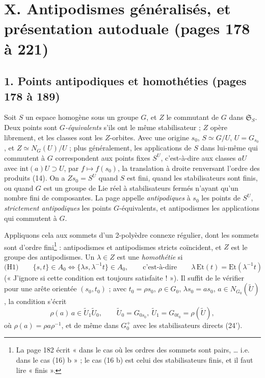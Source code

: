 \documentclass[11pt,a4paper]{article}
\begin{document}
\section*{X. Antipodismes généralisés, et présentation autoduale (pages 178 à 221)}

\subsection*{1. Points antipodiques et homothéties (pages 178 à 189)}

Soit $S$ un espace homogène sous un groupe $G$, et $Z$ le commutant de $G$ dans
$\mathfrak{S}_S$. Deux points sont \emph{$G$-équivalents} s'ils ont le même
stabilisateur ; $Z$ opère librement, et les classes sont les $Z$-orbites. Avec
une origine $s_0$, $S \simeq G/U$, $U = G_{s_0}$, et $Z \simeq N_G(U)/U$ ; plus
généralement, les applications de $S$ dans lui-même qui commutent à $G$
correspondent aux points fixes $S^{U}$, c'est-à-dire aux classes $aU$ avec
$\mathrm{int}(a)U \supset U$, par $f \mapsto f(s_0)$, la translation à droite
renversant l'ordre des produits (14). On a $Z s_0 = S^{U}$ quand $S$ est fini,
quand les stabilisateurs sont finis, ou quand $G$ est un groupe de Lie réel à
stabilisateurs fermés n'ayant qu'un nombre fini de composantes. La page appelle
\emph{antipodiques} à $s_0$ les points de $S^{U}$, \emph{strictement
antipodiques} les points $G$-équivalents, et antipodismes les applications qui
commutent à $G$.

Appliquons cela aux sommets d'un 2-polyèdre connexe régulier, dont les sommets
sont d'ordre fini\footnote{La page 182 écrit « dans le cas où les ordres des
sommets sont pairs, … i.e. dans le cas (16) b » ; le cas (16 b) est celui des
stabilisateurs finis, et il faut lire « finis ».} : antipodismes et antipodismes
stricts coïncident, et $Z$ est le groupe des antipodismes. Un $\lambda \in Z$ est
une \emph{homothétie} si
\[
  \text{(H1)} \qquad \{s, t\} \in A_0 \iff \{\lambda s, \lambda^{-1} t\} \in A_0 ,
  \qquad \text{c'est-à-dire} \qquad
  \lambda\,\mathrm{Et}(t) = \mathrm{Et}(\lambda^{-1} t)
\]
(« J'ignore si cette condition est toujours satisfaite ! »). Il suffit de
le vérifier pour une arête orientée $(s_0, t_0)$ ; avec $t_0 = \rho s_0$, $\rho
\in G_0$, $\lambda s_0 = a s_0$, $a \in N_{G_0}(\widetilde{U})$, la condition
s'écrit
\[
  \rho(a)\,a \in \widetilde{U}_1 \widetilde{U}_0 , \qquad
  \widetilde{U}_0 = G_{0s_0}, \ \widetilde{U}_1 = G_{0t_0} = \rho(\widetilde{U}),
\]
où $\rho(a) = \rho a \rho^{-1}$, et de même dans $G_0^{+}$ avec les
stabilisateurs directs (24').
\end{document}
